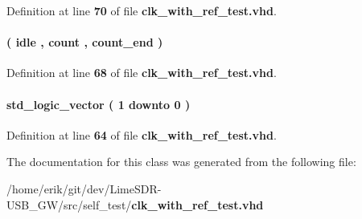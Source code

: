 Definition at line {\bf 70} of file {\bf clk\+\_\+with\+\_\+ref\+\_\+test.\+vhd}.

\paragraph[{state\+\_\+type}]{ {\bfseries \textcolor{vhdlchar}{(}\textcolor{vhdlchar}{ }\textcolor{vhdlchar}{idle}\textcolor{vhdlchar}{ }\textcolor{vhdlchar}{,}\textcolor{vhdlchar}{ }\textcolor{vhdlchar}{count}\textcolor{vhdlchar}{ }\textcolor{vhdlchar}{,}\textcolor{vhdlchar}{ }\textcolor{vhdlchar}{count\+\_\+end}\textcolor{vhdlchar}{ }\textcolor{vhdlchar}{)}\textcolor{vhdlchar}{ }} \hspace{0.3cm}{\ttfamily [Type]}}\label{classclk__with__ref__test_1_1arch_a5d63eac905ea5dbf6baaf64e5d8569d5}


Definition at line {\bf 68} of file {\bf clk\+\_\+with\+\_\+ref\+\_\+test.\+vhd}.

\paragraph[{test\+\_\+en\+\_\+reg}]{ {\bfseries \textcolor{comment}{std\+\_\+logic\+\_\+vector}\textcolor{vhdlchar}{ }\textcolor{vhdlchar}{(}\textcolor{vhdlchar}{ }\textcolor{vhdlchar}{ } \textcolor{vhdldigit}{1} \textcolor{vhdlchar}{ }\textcolor{keywordflow}{downto}\textcolor{vhdlchar}{ }\textcolor{vhdlchar}{ } \textcolor{vhdldigit}{0} \textcolor{vhdlchar}{ }\textcolor{vhdlchar}{)}\textcolor{vhdlchar}{ }} \hspace{0.3cm}{\ttfamily [Signal]}}\label{classclk__with__ref__test_1_1arch_a46a04c6cb1df7ed695c88bb6f815c26f}


Definition at line {\bf 64} of file {\bf clk\+\_\+with\+\_\+ref\+\_\+test.\+vhd}.



The documentation for this class was generated from the following file\+:\begin{DoxyCompactItemize}
\item 
/home/erik/git/dev/\+Lime\+S\+D\+R-\/\+U\+S\+B\+\_\+\+G\+W/src/self\+\_\+test/{\bf clk\+\_\+with\+\_\+ref\+\_\+test.\+vhd}\end{DoxyCompactItemize}

